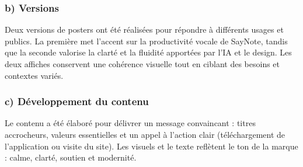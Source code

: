 \subsubsection*{b) Versions}
Deux versions de posters ont été réalisées pour répondre à différents usages et publics. La première met l’accent sur la productivité vocale de SayNote, tandis que la seconde valorise la clarté et la fluidité apportées par l’IA et le design. Les deux affiches conservent une cohérence visuelle tout en ciblant des besoins et contextes variés.

\subsubsection*{c) Développement du contenu}
Le contenu a été élaboré pour délivrer un message convaincant : titres accrocheurs, valeurs essentielles et un appel à l’action clair (téléchargement de l’application ou visite du site). Les visuels et le texte reflètent le ton de la marque : calme, clarté, soutien et modernité.

